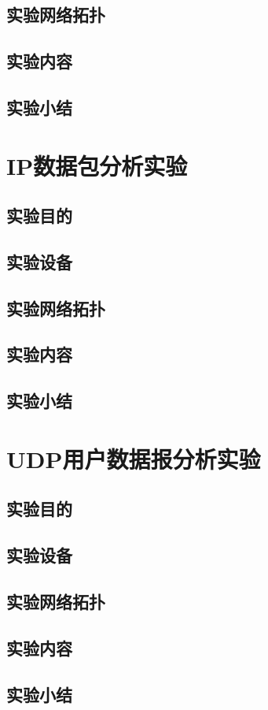 \documentclass[lang=cn,11pt,a4paper,cite=authoryear]{elegantpaper}
\begin{document}
\subsection{实验网络拓扑}
\subsection{实验内容}
\subsection{实验小结}
\section{IP数据包分析实验}
\subsection{实验目的}
\subsection{实验设备}
\subsection{实验网络拓扑}
\subsection{实验内容}
\subsection{实验小结}
\section{UDP用户数据报分析实验}
\subsection{实验目的}
\subsection{实验设备}
\subsection{实验网络拓扑}
\subsection{实验内容}
\subsection{实验小结}
\end{document}
